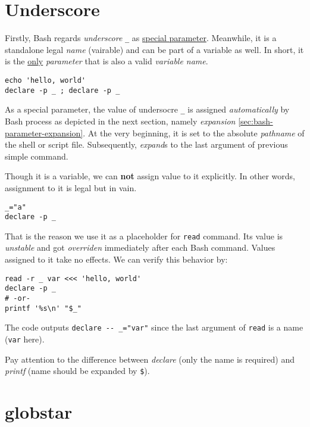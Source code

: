 \section{Underscore}
\label{sec:bash-underscore}

Firstly, Bash regards \textit{underscore} \lstinline|_| as
\href{https://www.gnu.org/software/bash/manual/bash.html#Special-Parameters}{special
  parameter}. Meanwhile, it is a standalone legal \textit{name}
(vairable) and can be part of a variable as well. In short, it is
the \uline{only} \textit{parameter} that is also a valid
\textit{variable name}.

\begin{lstlisting}
echo 'hello, world'
declare -p _ ; declare -p _
\end{lstlisting}

As a special parameter, the value of undersocre \verb|_| is
assigned \textit{automatically} by Bash process as depicted in the
next section, namely \textit{expansion}
\ref{sec:bash-parameter-expansion}. At the very beginning, it is
set to the absolute \textit{pathname} of the shell or script
file. Subsequently, \textit{expand}s to the last argument of
previous simple command.

Though it is a variable, we can \textbf{not} assign value to it
explicitly. In other words, assignment to it is legal but in vain.

\begin{lstlisting}
_="a"
declare -p _
\end{lstlisting}

That is the reason we use it as a placeholder for \lstinline|read|
command. Its value is \textit{unstable} and got \textit{overriden}
immediately after each Bash command. Values assigned to it take no
effects. We can verify this behavior by:

\begin{lstlisting}
read -r _ var <<< 'hello, world'
declare -p _
# -or-
printf '%s\n' "$_"
\end{lstlisting}

The code outputs \lstinline|declare -- _="var"| since the last
argument of \lstinline|read| is a name (\verb|var| here).

Pay attention to the difference between \textit{declare} (only the
name is required) and \textit{printf} (name should be expanded by
\lstinline|$|).

\section{globstar}
\label{sec:bash-globstar}

